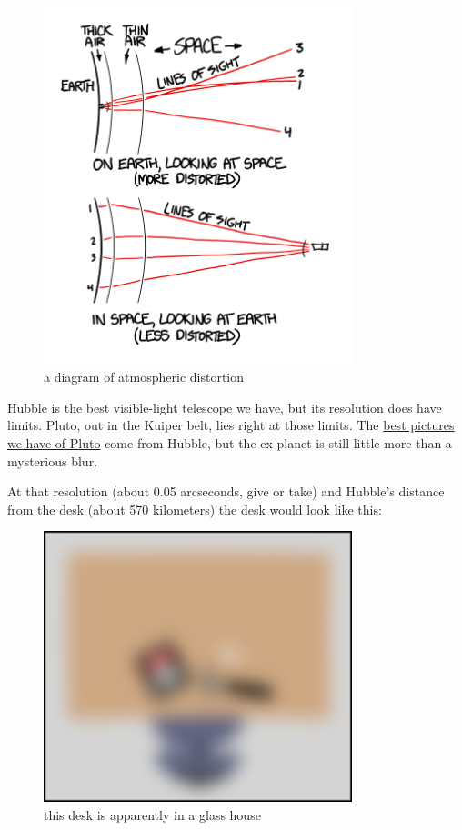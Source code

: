 \begin{figure}[!htbp]
\centering
\includegraphics[scale=0.5, max width=0.8\textwidth]{imgs/a/32/hubble_distortion.png}
\caption{a diagram of atmospheric distortion}
\end{figure}

{Hubble is the best visible-light telescope we have, but its resolution does have limits. Pluto, out in the Kuiper belt, lies right at those limits. The \href{http://hubblesite.org/newscenter/archive/releases/solar-system/pluto/2010/06/}{best pictures we have of Pluto} come from Hubble, but the ex-planet is still little more than a mysterious blur.}

{At that resolution (about 0.05 arcseconds, give or take) and Hubble’s distance from the desk (about 570 kilometers) the desk would look like this:}

\begin{figure}[!htbp]
\centering
\includegraphics[scale=0.5, max width=0.8\textwidth]{imgs/a/32/hubble_pluto.png}
\caption{this desk is apparently in a glass house}
\end{figure}

